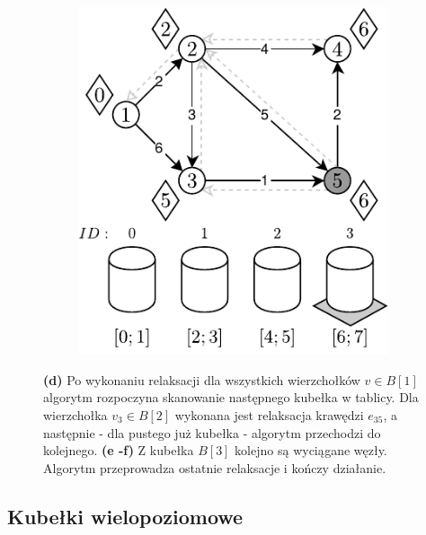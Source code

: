 \begin{figure}[!htbp]
\begin{subfigure}[b]{0.3\textwidth}
		\caption{}
	\end{subfigure}
	\begin{subfigure}[b]{0.3\textwidth}
		\includegraphics[width=\textwidth]{Chapter_II/APROXIMATE-BUCKETS-Example/f.pdf}
		\caption{}
	\end{subfigure}
	\caption{ \textbf{(d)} Po wykonaniu relaksacji dla wszystkich wierzchołków $v \in B \left[ 1 \right]$ algorytm rozpoczyna skanowanie następnego kubełka w tablicy. Dla wierzchołka $v_{3} \in B \left[ 2 \right]$ wykonana jest relaksacja krawędzi $e_{35}$, a następnie - dla pustego już kubełka - algorytm przechodzi do kolejnego. \textbf{(e -f)} Z kubełka $ B \left[ 3 \right]$ kolejno są wyciągane węzły. Algorytm przeprowadza ostatnie relaksacje i kończy działanie.} \label{fig:exampleAproximateBuckets2}
\end{figure}

\subsection{Kubełki wielopoziomowe}

